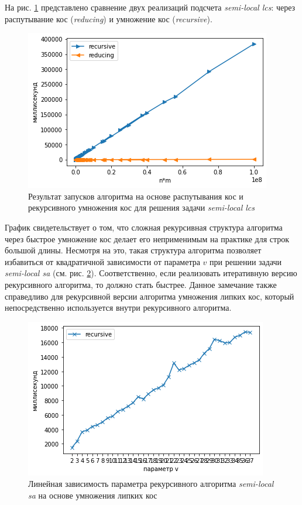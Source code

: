 На рис. \ref{fig:speedlcs2} представлено сравнение двух реализаций подсчета \emph{semi-local lcs}: через распутывание кос (\emph{reducing}) и  умножение кос (\emph{recursive}).
\begin{figure}[H]
\centering
    \includegraphics[width=0.6\columnwidth]{figures/semilocalReducignVssemiLocalRecursive.png}
    \caption{Результат запусков алгоритма на основе распутывания кос и рекурсивного умножения кос для решения задачи \emph{semi-local lcs} }\label{fig:speedlcs2}
\end{figure}
График свидетельствует о том, что сложная  рекурсивная структура алгоритма через быстрое умножение кос делает его неприменимым на практике  для строк  большой длины. Несмотря на это, такая структура алгоритма позволяет избавиться от квадратичной зависимости от параметра $v$ при решении задачи \emph{semi-local sa} (см. рис. \ref{fig:vParam}).
Соответственно, если реализовать итеративную версию рекурсивного алгоритма, то должно стать быстрее.
Данное замечание также справедливо для рекурсивной версии алгоритма умножения липких кос, который непосредственно используется внутри рекурсивного алгоритма.

\begin{figure}[t]
\centering
    \includegraphics[width=0.6\columnwidth]{figures/vDependenceImplicitSemiLocalSARecursie.png}
    \caption{Линейная зависимость параметра рекурсивного алгоритма \emph{semi-local sa} на основе умножения липких кос }\label{fig:vParam}
\end{figure}

